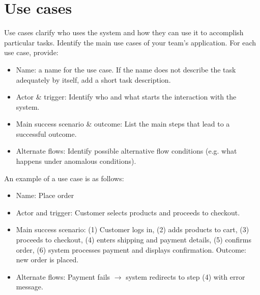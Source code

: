 \documentclass[10pt,a4paper]{article}
\begin{document}
\section*{Use cases}
Use cases clarify who uses the system and how they can use it to accomplish particular tasks.  Identify the main use cases of your team's application.  For each use case, provide:
\begin{itemize}
\item Name: a name for the use case.  If the name does not describe the task adequately by itself, add a short task description.
\item Actor \& trigger: Identify who and what starts the interaction with the system.
\item Main success scenario \& outcome: List the main steps that lead to a successful outcome.
\item Alternate flows: Identify possible alternative flow conditions (e.g. what happens under anomalous conditions).
\end{itemize}
An example of a use case is as follows:
\begin{itemize}
\item Name: Place order
\item Actor and trigger: Customer selects products and proceeds to checkout.
\item Main success scenario: (1) Customer logs in, (2) adds products to cart, (3) proceeds to checkout, (4) enters shipping and payment details, (5) confirms order, (6) system processes payment and displays confirmation. Outcome: new order is placed.
\item Alternate flows: Payment fails $\rightarrow$ system redirects to step (4) with error message.
\end{itemize}
\end{document}
